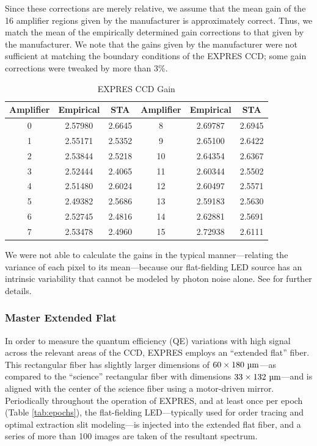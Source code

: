 Since these corrections are merely relative, we assume that the mean gain of the 16 amplifier regions given by the manufacturer is approximately correct. Thus, we match the mean of the empirically determined gain corrections to that given by the manufacturer. We note that the gains given by the manufacturer were not sufficient at matching the boundary conditions of the EXPRES CCD; some gain corrections were tweaked by more than 3\%.

\begin{table}[ht!]
\centering
\caption{EXPRES CCD Gain\label{tab:gain}}
    \begin{tabular}{ccc|ccc}
        \hline
        \hline
        Amplifier & Empirical & STA & Amplifier & Empirical & STA \\
        \hline
        0 & 2.57980 & 2.6645 & 8 & 2.69787 & 2.6945 \\
        1 & 2.55171 & 2.5352 & 9 & 2.65100 & 2.6422 \\
        2 & 2.53844 & 2.5218 & 10 & 2.64354 & 2.6367 \\
        3 & 2.52444 & 2.4065 & 11 & 2.60344 & 2.5502 \\
        4 & 2.51480 & 2.6024 & 12 & 2.60497 & 2.5571 \\
        5 & 2.49382 & 2.5686 & 13 & 2.59183 & 2.5630 \\
        6 & 2.52745 & 2.4816 & 14 & 2.62881 & 2.5691 \\
        7 & 2.53478 & 2.4960 & 15 & 2.72938 & 2.6111 \\
        \hline
    \end{tabular}
\end{table}

We were not able to calculate the gains in the typical manner---relating the variance of each pixel to its mean---because our flat-fielding LED source has an intrinsic variability that cannot be modeled by photon noise alone. See \citet{blackman_performance_2020} for further details.

\subsubsection{Master Extended Flat}
\label{pipeline:master-flat}

In order to measure the quantum efficiency (QE) variations with high signal across the relevant areas of the CCD, EXPRES employs an ``extended flat'' fiber. This rectangular fiber has slightly larger dimensions of $60 \times 180 ~\si{\micro\meter}$---as compared to the ``science'' rectangular fiber with dimensions $33 \times 132~\si{\micro\meter}$---and is aligned with the center of the science fiber using a motor-driven mirror. Periodically throughout the operation of EXPRES, and at least once per epoch (Table \ref{tab:epochs}), the flat-fielding LED---typically used for order tracing and optimal extraction slit modeling---is injected into the extended flat fiber, and a series of more than 100 images are taken of the resultant spectrum.

